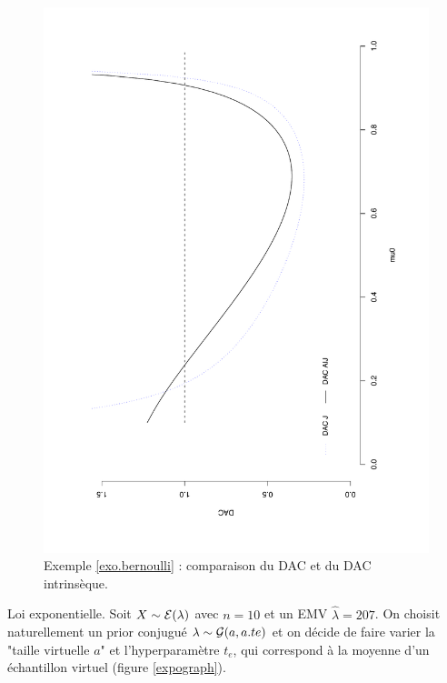 \begin{figure}[h!]
    \centering
    \includegraphics[scale=0.4,angle=270]{figures/critics/betaglop1.pdf}
    \caption{Exemple \ref{exo.bernoulli} : comparaison du DAC et du DAC intrinsèque.}
    \label{betaglop1}
\end{figure}


\begin{exo}{Loi exponentielle.}\label{exo.expo00}
Soit $X\sim {\cal{E}}(\lambda)$ avec $n=10$ et un EMV $\hat{\lambda}=207$. On choisit naturellement un prior conjugué $ \lambda  \sim  {\cal{G}}(a,a.te)$ et on décide de faire varier la "taille virtuelle $a$" et l'hyperparamètre $t_e$, qui correspond à la moyenne d'un échantillon virtuel (figure \ref{expograph}).  \\
\end{exo}


